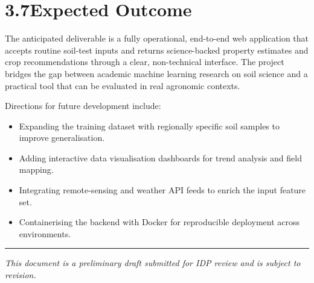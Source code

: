 \documentclass[12pt,a4paper]{article}
\begin{document}
\section{3.7\quad Expected Outcome}

The anticipated deliverable is a fully operational, end-to-end web application
that accepts routine soil-test inputs and returns science-backed property
estimates and crop recommendations through a clear, non-technical interface.
The project bridges the gap between academic machine learning research on soil
science and a practical tool that can be evaluated in real agronomic contexts.

Directions for future development include:

\begin{itemize}
  \item Expanding the training dataset with regionally specific soil samples to
        improve generalisation.
  \item Adding interactive data visualisation dashboards for trend analysis and
        field mapping.
  \item Integrating remote-sensing and weather API feeds to enrich the input
        feature set.
  \item Containerising the backend with Docker for reproducible deployment
        across environments.
\end{itemize}

\vspace{1.5cm}
\hrule
\vspace{0.5cm}
{\small\itshape This document is a preliminary draft submitted for IDP review
and is subject to revision.}
\end{document}
